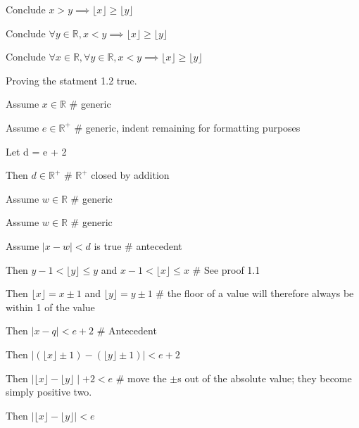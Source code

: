 \documentclass[boldsans]{article}
\newcommand{\floor}[1]{\lfloor #1\rfloor}
\begin{document}
\begin{enumerate}
\begin{description}
\begin{description}
\begin{description}
            \item Conclude $x > y \implies \floor{x} \geq \floor{y}$
            \end{description}
        \item Conclude $\forall y \in \mathbb{R}, x < y \implies \floor{x} \geq \floor{y}$
        \end{description}
    \item Conclude $\forall x \in \mathbb{R}, \forall y \in \mathbb{R}, x < y \implies \floor{x} \geq \floor{y}$
    \end{description}
\item Proving the statment 1.2 true.
    \begin{description}
    \item Assume $x \in \mathbb{R}$ \# generic
    \item Assume $e \in \mathbb{R}^+$ \# generic, indent remaining for formatting purposes
        \begin{description}
        \item Let d = e + 2
        \item Then $d \in \mathbb{R}^+$ \# $\mathbb{R}^+$ closed by addition
        \item Assume $w \in \mathbb{R}$ \# generic
            \begin{description}
            \item Assume $w \in \mathbb{R}$ \# generic
                \begin{description}
                \item Assume $\mid x - w \mid < d$ is true \# antecedent
                    \begin{description}
                    \item Then $y - 1 < \floor{y} \leq y$ and $x - 1 < \floor{x} \leq x$ \# See proof 1.1
                    \item Then $\floor{x} = x \pm 1$ and $\floor{y} = y \pm 1$ \# the floor of a value will therefore always be within 1 of the value
                    \item Then $\mid x - q \mid < e + 2$ \# Antecedent
                    \item Then $\mid (\floor{x} \pm 1) - (\floor{y} \pm 1) \mid < e + 2$
                    \item Then $\mid \floor{x} - \floor{y} \mid + 2 < e$ \# move the $\pm$s out of the absolute value; they become simply positive two.
                    \item Then $\mid \floor{x} - \floor{y} \mid < e$
                    \end{description}
                        

\end{description}
\end{description}
\end{description}
\end{description}
\end{enumerate}
\end{document}
